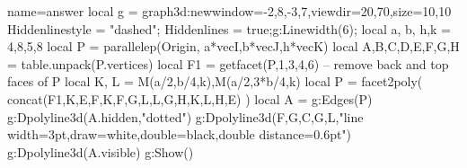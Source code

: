 \documentclass{standalone}
\begin{document}
 \begin{luadraw}{name=answer}
local g = graph3d:new{window={-2,8,-3,7},viewdir={20,70},size={10,10}}
Hiddenlinestyle = "dashed"; Hiddenlines = true;g:Linewidth(6);
local a, b, h,k = 4,8,5,8
local P = parallelep(Origin, a*vecI,b*vecJ,h*vecK)
local A,B,C,D,E,F,G,H = table.unpack(P.vertices)
local F1 = getfacet(P,{1,3,4,6}) -- remove back and top faces of P
local K, L = M(a/2,b/4,k),M(a/2,3*b/4,k) 
local P = facet2poly( concat(F1,{{K,E,F},{K,F,G,L},{L,G,H},{K,L,H,E}}) )
local A = g:Edges(P)
g:Dpolyline3d(A.hidden,"dotted")
g:Dpolyline3d({{F,G},{C,G,L}},"line width=3pt,draw=white,double=black,double distance=0.6pt")
g:Dpolyline3d(A.visible)
g:Show()
\end{luadraw}
\end{document}
